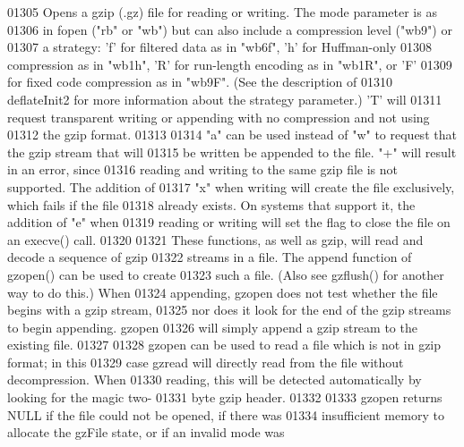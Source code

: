 \begin{DoxyCode}
01305 \textcolor{comment}{     Opens a gzip (.gz) file for reading or writing.  The mode parameter is as}
01306 \textcolor{comment}{   in fopen ("rb" or "wb") but can also include a compression level ("wb9") or}
01307 \textcolor{comment}{   a strategy: 'f' for filtered data as in "wb6f", 'h' for Huffman-only}
01308 \textcolor{comment}{   compression as in "wb1h", 'R' for run-length encoding as in "wb1R", or 'F'}
01309 \textcolor{comment}{   for fixed code compression as in "wb9F".  (See the description of}
01310 \textcolor{comment}{   deflateInit2 for more information about the strategy parameter.)  'T' will}
01311 \textcolor{comment}{   request transparent writing or appending with no compression and not using}
01312 \textcolor{comment}{   the gzip format.}
01313 \textcolor{comment}{}
01314 \textcolor{comment}{     "a" can be used instead of "w" to request that the gzip stream that will}
01315 \textcolor{comment}{   be written be appended to the file.  "+" will result in an error, since}
01316 \textcolor{comment}{   reading and writing to the same gzip file is not supported.  The addition of}
01317 \textcolor{comment}{   "x" when writing will create the file exclusively, which fails if the file}
01318 \textcolor{comment}{   already exists.  On systems that support it, the addition of "e" when}
01319 \textcolor{comment}{   reading or writing will set the flag to close the file on an execve() call.}
01320 \textcolor{comment}{}
01321 \textcolor{comment}{     These functions, as well as gzip, will read and decode a sequence of gzip}
01322 \textcolor{comment}{   streams in a file.  The append function of gzopen() can be used to create}
01323 \textcolor{comment}{   such a file.  (Also see gzflush() for another way to do this.)  When}
01324 \textcolor{comment}{   appending, gzopen does not test whether the file begins with a gzip stream,}
01325 \textcolor{comment}{   nor does it look for the end of the gzip streams to begin appending.  gzopen}
01326 \textcolor{comment}{   will simply append a gzip stream to the existing file.}
01327 \textcolor{comment}{}
01328 \textcolor{comment}{     gzopen can be used to read a file which is not in gzip format; in this}
01329 \textcolor{comment}{   case gzread will directly read from the file without decompression.  When}
01330 \textcolor{comment}{   reading, this will be detected automatically by looking for the magic two-}
01331 \textcolor{comment}{   byte gzip header.}
01332 \textcolor{comment}{}
01333 \textcolor{comment}{     gzopen returns NULL if the file could not be opened, if there was}
01334 \textcolor{comment}{   insufficient memory to allocate the gzFile state, or if an invalid mode was}

\end{DoxyCode}
